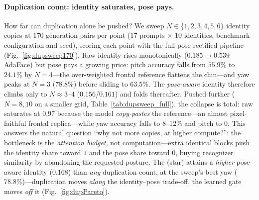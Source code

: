 \paragraph{Duplication count: identity saturates, pose pays.}
How far can duplication alone be pushed? We sweep $N\in\{1,2,3,4,5,6\}$ identity
copies at $170$ generation pairs per point ($17$ prompts $\times$ $10$
identities, benchmark configuration and seed), scoring each point with the full
pose-rectified pipeline (Fig.~\ref{fig:dupsweep170}). Raw identity rises
monotonically ($0.185\!\rightarrow\!0.539$ AdaFace) but pose pays a growing
price: pitch accuracy falls from $55.9\%$ to $24.1\%$ by $N{=}4$---the
over-weighted frontal reference flattens the chin---and yaw peaks at $N{=}3$
($78.8\%$) before sliding to $63.5\%$. The \emph{pose-aware} identity therefore
climbs only to $N{\approx}3$--$4$ ($0.156$/$0.161$) and folds thereafter. Pushed
further ($N{=}8,10$ on a smaller grid, Table~\ref{tab:dupsweep_full}), the
collapse is total: raw \csim{}
saturates at $0.97$ because the model \emph{copy-pastes} the reference---an
almost pixel-faithful frontal replica---while yaw accuracy falls to
$8$--$12\%$ and pitch to $0$. This answers the natural question ``why not more
copies, at higher compute?'': the bottleneck is the \emph{attention budget}, not
computation---extra identical blocks push the identity share toward $1$ and the
pose share toward $0$, buying recognizer similarity by abandoning the requested
posture. The \gate{} (star) attains a \emph{higher} pose-aware identity
($0.168$) than \emph{any} duplication count, at the sweep's best yaw
($78.8\%$)---duplication moves \emph{along} the identity--pose trade-off, the
learned gate moves \emph{off} it (Fig.~\ref{fig:dupPareto}).

